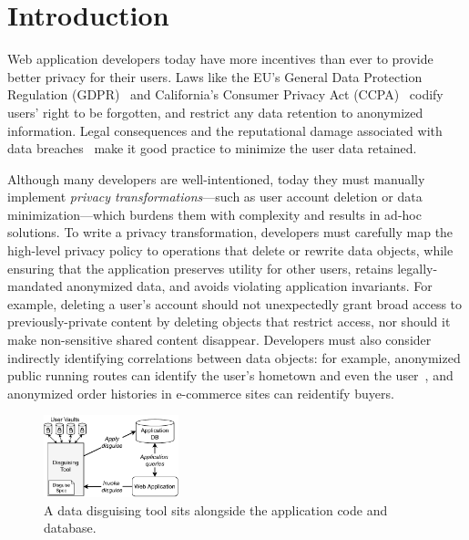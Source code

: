 \section{Introduction}
Web application developers today have more incentives than ever to provide better privacy for their
users.
%
Laws like the EU's General Data Protection Regulation (GDPR)~\cite{eu:gdpr} and California's
Consumer Privacy Act (CCPA)~\cite{ca:privacy-act} codify users' right to be forgotten, and restrict
any data retention to anonymized information.
%
Legal consequences and the reputational damage associated with data breaches~\cite{breach:amazon,
breach:twitter, breach:fb, breach:marriott, breach:quora} make it good practice to minimize the user
data retained.
%

%
Although many developers are well-intentioned, today they must manually implement \emph{privacy
transformations}---such as user account deletion or data minimization---which burdens
them with complexity and results in ad-hoc solutions. %
%
%
To write a privacy transformation, developers must carefully map the high-level privacy policy to
operations that delete or rewrite data objects, while ensuring that the application preserves
utility for other users, retains legally-mandated anonymized data, and avoids violating application
invariants.
%
For example, deleting a user's account should not unexpectedly grant broad access to
previously-private content by deleting objects that restrict access, nor should it make
non-sensitive shared content disappear.
%
Developers must also consider indirectly identifying correlations between data objects: for example,
anonymized public running routes can identify the user's hometown and even the
user~\cite{strava:heatmap}, and anonymized order histories in e-commerce sites can reidentify
buyers.

\begin{figure}[t]
    \centering
    \includegraphics[width=0.35\textwidth]{img/disguise_tool}

    \caption{A data disguising tool sits alongside the application code and database.}
    \label{fig:tool}
\end{figure}


